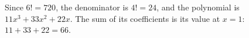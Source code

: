 Since $6!=720$, the denominator is $4!=24$, and the polynomial is $11x^3+33x^2+22x$. The sum of its coefficients is its value at $x=1$: $11+33+22=\boxed{66}$.
